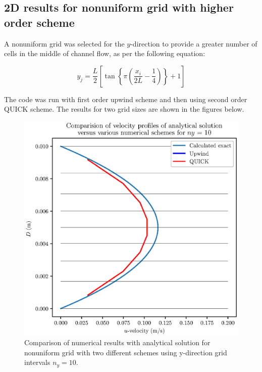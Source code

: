 \documentclass[12pt,a4paper,fleqn]{article}
\begin{document}
\subsection{2D results for nonuniform grid with higher order scheme}

A nonuniform grid was selected for the \(y\)-direction to provide a greater number of cells in the middle of channel flow, as per the following equation:

\begin{equation}\label{eq:y_grid_nonuniform}
y_j = \frac{L}{2}\left[
\tan \left\lbrace
\pi \left(\frac{x_i}{2L} - \frac{1}{4}\right)\right\rbrace
+ 1 \right]
\end{equation}

The code was run with first order upwind scheme and then using second order QUICK scheme. The results for two grid sizes are shown in the figures below.

\begin{figure}[H]
    \centering
    \includegraphics[width=\textwidth]{ny-10_profilesComparison.eps}
    \caption{Comparison of numerical results with analytical solution for nonuniform grid with two different schemes using y-direction grid intervals \(n_y = 10\).}
    \label{fig:ny-10_profilesComparison.eps}
\end{figure}
\end{document}
